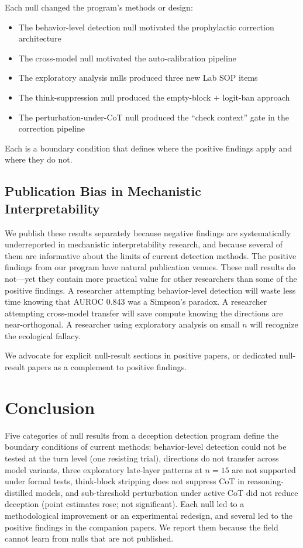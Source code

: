 \documentclass[11pt,letterpaper]{article}
\begin{document}
Each null changed the program's methods or design:
\begin{itemize}
  \item The behavior-level detection null motivated the prophylactic correction architecture
  \item The cross-model null motivated the auto-calibration pipeline
  \item The exploratory analysis nulls produced three new Lab SOP items
  \item The think-suppression null produced the empty-block $+$ logit-ban approach
  \item The perturbation-under-CoT null produced the ``check context'' gate in the correction pipeline
\end{itemize}

Each is a boundary condition that defines where the positive findings apply and where they do not.

\subsection{Publication Bias in Mechanistic Interpretability}

We publish these results separately because negative findings are systematically underreported in
mechanistic interpretability research, and because several of them are informative about the limits
of current detection methods. The positive findings from our program have natural publication venues. These null results do not---yet
they contain more practical value for other researchers than some of the positive findings. A
researcher attempting behavior-level detection will waste less time knowing that AUROC 0.843 was a
Simpson's paradox. A researcher attempting cross-model transfer will save compute knowing the
directions are near-orthogonal. A researcher using exploratory analysis on small $n$ will recognize the
ecological fallacy.

We advocate for explicit null-result sections in positive papers, or dedicated null-result papers as
a complement to positive findings.

\section{Conclusion}\label{sec:conclusion}

Five categories of null results from a deception detection program define the boundary conditions of
current methods: behavior-level detection could not be tested at the turn level (one resisting trial), directions do not
transfer across model variants, three exploratory late-layer patterns at $n=15$ are not supported
under formal tests, think-block stripping does not suppress CoT in reasoning-distilled models, and
sub-threshold perturbation under active CoT did not reduce deception (point estimates rose; not
significant). Each null led to a methodological
improvement or an experimental redesign, and several led to the positive findings in the companion
papers. We report them because the field cannot learn
from nulls that are not published.
\end{document}
